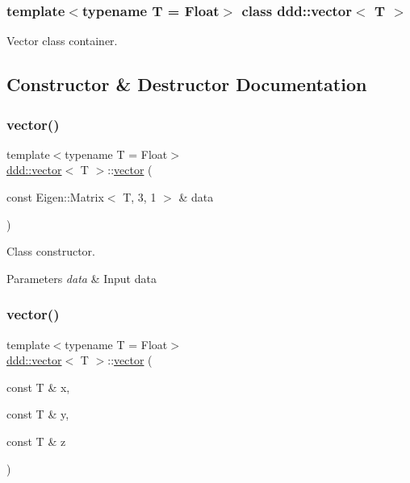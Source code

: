 \subsubsection*{template$<$typename T = Float$>$\newline
class ddd\+::vector$<$ T $>$}

Vector class container. 

\subsection{Constructor \& Destructor Documentation}
\mbox{\label{classddd_1_1vector_a5dec8f05a011372b6b2795827607e6b2}} 
\subsubsection{\texorpdfstring{vector()}{vector()}\hspace{0.1cm}{\footnotesize\ttfamily [1/3]}}
{\footnotesize\ttfamily template$<$typename T = Float$>$ \\
\hyperlink{classddd_1_1vector}{ddd\+::vector}$<$ T $>$\+::\hyperlink{classddd_1_1vector}{vector} (\begin{DoxyParamCaption}\item[{const Eigen\+::\+Matrix$<$ T, 3, 1 $>$ \&}]{data }\end{DoxyParamCaption})\hspace{0.3cm}{\ttfamily [inline]}}



Class constructor. 


\begin{DoxyParams}{Parameters}
{\em data} & Input data \\
\hline
\end{DoxyParams}
\mbox{\label{classddd_1_1vector_a90f097b576d026cb86b487546b841622}} 
\subsubsection{\texorpdfstring{vector()}{vector()}\hspace{0.1cm}{\footnotesize\ttfamily [2/3]}}
{\footnotesize\ttfamily template$<$typename T = Float$>$ \\
\hyperlink{classddd_1_1vector}{ddd\+::vector}$<$ T $>$\+::\hyperlink{classddd_1_1vector}{vector} (\begin{DoxyParamCaption}\item[{const T \&}]{x,  }\item[{const T \&}]{y,  }\item[{const T \&}]{z }\end{DoxyParamCaption})\hspace{0.3cm}{\ttfamily [inline]}}



